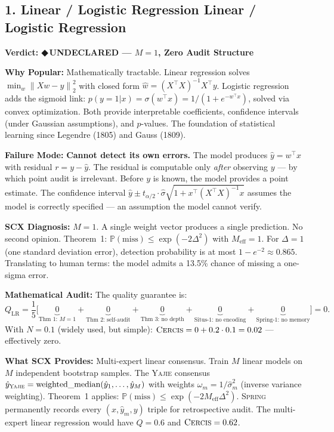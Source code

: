 \documentclass[12pt,a4paper]{article}
\theoremstyle{definition}
\newcommand{\guilty}{{\color{guiltycolor}\textbf{◆\,UNDECLARED}}}
\newcommand{\Yajie}{\textsc{Yajie}}
\newcommand{\Spring}{\textsc{Spring}}
\newcommand{\Cercis}{\textsc{Cercis}}
\newcommand{\Pbb}{\mathbb{P}}
\newcommand{\norm}[1]{\left\lVert#1\right\rVert}
\newcommand{\auditHeader}[1]{\medskip\noindent\textbf{\large #1}\medskip}
\newcommand{\whyPopular}{\noindent\textbf{Why Popular:} }
\newcommand{\whyFail}{\noindent\textbf{Failure Mode:} }
\newcommand{\whatMissing}{\noindent\textbf{What SCX Provides:} }
\newcommand{\diagnosis}{\noindent\textbf{SCX Diagnosis:} }
\newcommand{\mathAudit}{\noindent\textbf{Mathematical Audit:} }
\begin{document}
\subsection{1. Linear / Logistic Regression Linear / Logistic Regression}

\auditHeader{Verdict: \guilty{} — $M=1$, Zero Audit Structure}

\whyPopular{} Mathematically tractable. Linear regression solves $\min_w \norm{Xw - y}_2^2$ with closed form $\hat{w} = (X^\top X)^{-1}X^\top y$. Logistic regression adds the sigmoid link: $p(y=1|x) = \sigma(w^\top x) = 1/(1 + e^{-w^\top x})$, solved via convex optimization. Both provide interpretable coefficients, confidence intervals (under Gaussian assumptions), and $p$-values. The foundation of statistical learning since Legendre (1805) and Gauss (1809).

\whyFail{} \textbf{Cannot detect its own errors.} The model produces $\hat{y} = w^\top x$ with residual $r = y - \hat{y}$. The residual is computable only \textit{after} observing $y$ — by which point audit is irrelevant. Before $y$ is known, the model provides a point estimate. The confidence interval $\hat{y} \pm t_{\alpha/2} \cdot \hat{\sigma}\sqrt{1 + x^\top(X^\top X)^{-1}x}$ assumes the model is correctly specified — an assumption the model cannot verify.

\diagnosis{} $M=1$. A single weight vector produces a single prediction. No second opinion. Theorem~1: $\Pbb(\text{miss}) \le \exp(-2\Delta^2)$ with $M_{\text{eff}}=1$. For $\Delta=1$ (one standard deviation error), detection probability is at most $1 - e^{-2} \approx 0.865$. Translating to human terms: the model admits a 13.5\% chance of missing a one-sigma error.

\mathAudit{} The quality guarantee is:
\begin{equation}\label{eq:linreg_Q}
    Q_{\text{LR}} = \frac{1}{5}\bigl[\underbrace{0}_{\text{Thm 1: } M=1} + \underbrace{0}_{\text{Thm 2: self-audit}} + \underbrace{0}_{\text{Thm 3: no depth}} + \underbrace{0}_{\text{Situs-1: no encoding}} + \underbrace{0}_{\text{Spring-1: no memory}}\bigr] = 0.
\end{equation}
With $N=0.1$ (widely used, but simple): $\Cercis = 0 + 0.2 \cdot 0.1 = 0.02$ — effectively zero.

\whatMissing{} Multi-expert linear consensus. Train $M$ linear models on $M$ independent bootstrap samples. The \Yajie{} consensus $\hat{y}_{\Yajie} = \text{weighted\_median}(\hat{y}_1, \ldots, \hat{y}_M)$ with weights $\omega_m = 1/\hat{\sigma}_m^2$ (inverse variance weighting). Theorem~1 applies: $\Pbb(\text{miss}) \le \exp(-2M_{\text{eff}}\Delta^2)$. \Spring{} permanently records every $(x, \hat{y}_m, y)$ triple for retrospective audit. The multi-expert linear regression would have $Q = 0.6$ and $\Cercis = 0.62$.
\end{document}
